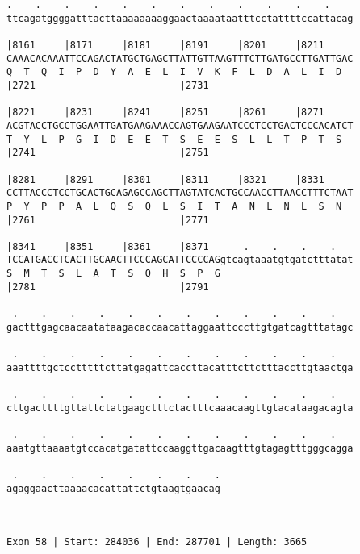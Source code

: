 \documentclass{article}
\begin{document}
\begin{Verbatim}
.    .    .    .    .    .    .    .    .    .    .    .    
ttcagatggggatttacttaaaaaaaaggaactaaaataatttcctattttccattacag
                                                            
|8161     |8171     |8181     |8191     |8201     |8211     
CAAACACAAATTCCAGACTATGCTGAGCTTATTGTTAAGTTTCTTGATGCCTTGATTGAC
Q  T  Q  I  P  D  Y  A  E  L  I  V  K  F  L  D  A  L  I  D  
|2721                         |2731                         
  
|8221     |8231     |8241     |8251     |8261     |8271     
ACGTACCTGCCTGGAATTGATGAAGAAACCAGTGAAGAATCCCTCCTGACTCCCACATCT
T  Y  L  P  G  I  D  E  E  T  S  E  E  S  L  L  T  P  T  S  
|2741                         |2751                         
  
|8281     |8291     |8301     |8311     |8321     |8331     
CCTTACCCTCCTGCACTGCAGAGCCAGCTTAGTATCACTGCCAACCTTAACCTTTCTAAT
P  Y  P  P  A  L  Q  S  Q  L  S  I  T  A  N  L  N  L  S  N  
|2761                         |2771                         
  
|8341     |8351     |8361     |8371      .    .    .    .   
TCCATGACCTCACTTGCAACTTCCCAGCATTCCCCAGgtcagtaaatgtgatctttatat
S  M  T  S  L  A  T  S  Q  H  S  P  G                       
|2781                         |2791                         
  
 .    .    .    .    .    .    .    .    .    .    .    .   
gactttgagcaacaatataagacaccaacattaggaattcccttgtgatcagtttatagc
                                                            
 .    .    .    .    .    .    .    .    .    .    .    .   
aaattttgctcctttttcttatgagattcaccttacatttcttctttaccttgtaactga
                                                            
 .    .    .    .    .    .    .    .    .    .    .    .   
cttgacttttgttattctatgaagctttctactttcaaacaagttgtacataagacagta
                                                            
 .    .    .    .    .    .    .    .    .    .    .    .   
aaatgttaaaatgtccacatgatattccaaggttgacaagtttgtagagtttgggcagga
                                                            
 .    .    .    .    .    .    .    .
agaggaacttaaaacacattattctgtaagtgaacag
                                     
                                     
 
Exon 58 | Start: 284036 | End: 287701 | Length: 3665




\end{Verbatim}
\end{document}
